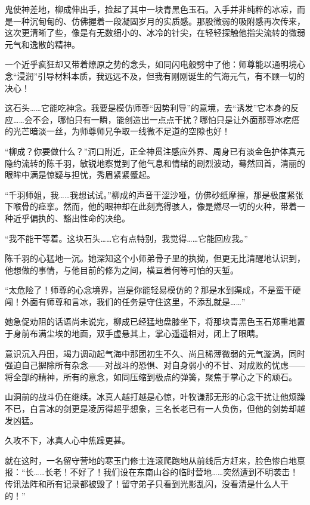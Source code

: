 鬼使神差地，柳成伸出手，捡起了其中一块青黑色玉石。入手并非纯粹的冰凉，而是一种沉甸甸的、仿佛握着一段凝固岁月的实质感。那股微弱的吸附感再次传来，这次更清晰了些，像是有无数细小的、冰冷的针尖，在轻轻探触他指尖流转的微弱元气和逸散的精神。

一个近乎疯狂却又带着燎原之势的念头，如同闪电般劈中了他：师尊能以通明境心念“浸润”引导材料本质，我远远不及，但我有刚刚诞生的气海元气，有不顾一切的决心！

这石头……它能吃神念。我要是模仿师尊“因势利导”的意境，去“诱发”它本身的反应……会不会，哪怕只有一瞬，能创造出一点点干扰？哪怕只是让外面那尊冰疙瘩的光芒暗淡一丝，为师尊师兄争取一线微不足道的空隙也好！

“柳成？你要做什么？”洞口附近，正全神贯注感应外界、周身已有淡金色护体真元隐约流转的陈千羽，敏锐地察觉到了他气息和情绪的剧烈波动，蓦然回首，清丽的眼眸中满是惊疑与担忧，秀眉紧紧蹙起。

“千羽师姐，我……我想试试。”柳成的声音干涩沙哑，仿佛砂纸摩擦，那是极度紧张下喉骨的痉挛。然而，他的眼神却在此刻亮得骇人，像是燃尽一切的火种，带着一种近乎偏执的、豁出性命的决绝。

“我不能干等着。这块石头……它有点特别，我觉得……它能回应我。”

陈千羽的心猛地一沉。她深知这个小师弟骨子里的执拗，但更无比清醒地认识到，他想做的事情，与他目前的修为之间，横亘着何等可怕的天堑。

“太危险了！师尊的心念境界，岂是你能轻易模仿的？那是水到渠成，不是蛮干硬闯！外面有师尊和言冰，我们的任务是守住这里，不添乱就是……”

她急促劝阻的话语尚未说完，柳成已经猛地盘膝坐下，将那块青黑色玉石郑重地置于身前布满尘埃的地面，双手虚悬其上，掌心遥遥相对，闭上了眼睛。

意识沉入丹田，竭力调动起气海中那团初生不久、尚且稀薄微弱的元气漩涡，同时强迫自己摒除所有杂念——对战斗的恐惧、对自身弱小的不甘、对成败的忧虑——将全部的精神，所有的意念，如同压缩到极点的弹簧，聚焦于掌心之下的顽石。

\vspace{2em}

山洞前的战斗仍在继续。冰真人越打越是心惊，叶牧谦那无形的心念干扰让他烦躁不已，白言冰的剑更是凌厉得超乎想象，三名长老已有一人负伤，但他的剑势却越发凶猛。

久攻不下，冰真人心中焦躁更甚。

就在这时，一名留守营地的寒玉门修士连滚爬跑地从前线后方赶来，脸色惨白地禀报：“长……长老！不好了！我们设在东南山谷的临时营地……突然遭到不明袭击！传讯法阵和所有记录都被毁了！留守弟子只看到光影乱闪，没看清是什么人干的！”

